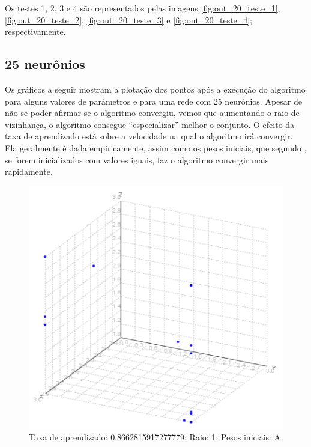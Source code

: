 Os testes 1, 2, 3 e 4 são representados pelas imagens \ref{fig:out_20_teste_1}, \ref{fig:out_20_teste_2}, \ref{fig:out_20_teste_3} e \ref{fig:out_20_teste_4}; respectivamente.


\subsection{25 neurônios}
Os gráficos a seguir mostram a plotação dos pontos após a execução do algoritmo para alguns valores de parâmetros e para 
uma rede com 25 neurônios. Apesar de não se poder afirmar se o algoritmo convergiu, vemos que aumentando o raio de vizinhança,
o algoritmo consegue ``especializar'' melhor o conjunto. O efeito da taxa de aprendizado está sobre a velocidade na qual o 
algoritmo irá convergir. Ela geralmente é dada empiricamente, assim como os pesos iniciais, que segundo \cite{Kohonen}, se forem
inicializados com valores iguais, faz o algoritmo convergir mais rapidamente.

\begin{figure}[ht!]
	\centering
	\includegraphics[scale=0.65]{./imgs/2a1.png}
	\caption{Taxa de aprendizado: 0.8662815917277779; Raio: 1; Pesos iniciais: A}
\end{figure}

